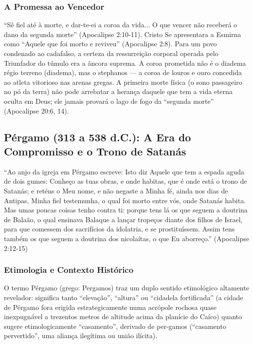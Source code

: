 \subsubsection*{A Promessa ao Vencedor}
``Sê fiel até à morte, e dar-te-ei a coroa da vida... O que vencer não receberá o dano da segunda morte'' (Apocalipse 2:10-11). Cristo Se apresentara a Esmirna como ``Aquele que foi morto e reviveu'' (Apocalipse 2:8). Para um povo condenado ao cadafalso, a certeza da ressurreição corporal operada pelo Triunfador do túmulo era a âncora suprema. A coroa prometida não é o diadema régio terreno (diadema), mas o stephanos — a coroa de louros e ouro concedida ao atleta vitorioso nas arenas gregas. A primeira morte física (o sono passageiro no pó da terra) não pode arrebatar a herança daquele que tem a vida eterna oculta em Deus; ele jamais provará o lago de fogo da ``segunda morte'' (Apocalipse 20:6, 14).



\subsection{Pérgamo (313 a 538 d.C.): A Era do Compromisso e o Trono de Satanás}


``Ao anjo da igreja em Pérgamo escreve: Isto diz Aquele que tem a espada aguda de dois gumes: Conheço as tuas obras, e onde habitas, que é onde está o trono de Satanás; e reténs o Meu nome, e não negaste a Minha fé, ainda nos dias de Antipas, Minha fiel testemunha, o qual foi morto entre vós, onde Satanás habita. Mas umas poucas coisas tenho contra ti: porque tens lá os que seguem a doutrina de Balaão, o qual ensinava Balaque a lançar tropeços diante dos filhos de Israel, para que comessem dos sacrifícios da idolatria, e se prostituíssem. Assim tens também os que seguem a doutrina dos nicolaítas, o que Eu aborreço.'' (Apocalipse 2:12-15)


\subsubsection*{Etimologia e Contexto Histórico}
O termo Pérgamo (grego: Pergamos) traz um duplo sentido etimológico altamente revelador: significa tanto ``elevação'', ``altura'' ou ``cidadela fortificada'' (a cidade de Pérgamo fora erigida estrategicamente numa acrópole rochosa quase inexpugnável a trezentos metros de altitude acima da planície do Caíco) quanto sugere etimologicamente ``casamento'', derivado de per-gamos (``casamento pervertido'', uma aliança ilegítima ou união ilícita).

